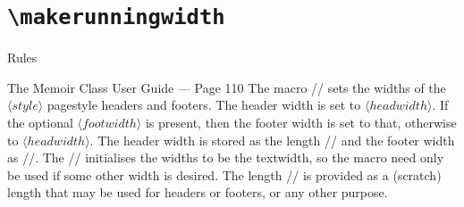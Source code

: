 \documentclass{beamer}
\begin{document}
\section{\texttt{\textbackslash makerunningwidth}}

\begin{frame}{Rules}
  \begin{block}{The Memoir Class User Guide --- Page 110}
    The macro \ltxverb/\makerunningwidth/ sets the widths of the $⟨style⟩$
    pagestyle headers and footers.
    The header width is set to $⟨headwidth⟩$.
    If the optional $⟨footwidth⟩$ is present, then the footer
    width is set to that, otherwise to $⟨headwidth⟩$.
    The header width is stored as the length \ltxverb/\styleheadrunwidth/
    and the footer width as \ltxverb/\stylefootrunwidth/.
    The \ltxverb/\makepagestyle/ initialises the widths to be the textwidth,
    so the macro need only be used if some other width is desired.
    The length \ltxverb/\headwidth/ is provided as a (scratch) length that may
    be used for headers or footers, or any other purpose.
  \end{block}
\end{frame}
\end{document}
